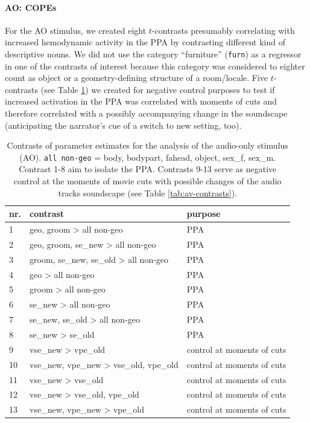 \documentclass[english]{article}
\begin{document}
\paragraph{AO: COPEs}



For the AO stimulus, we created eight $t$-contrasts presumably correlating with
increased hemodynamic activity in the PPA by contrasting different kind of
descriptive nouns.
We did not use the category ``furniture'' (\texttt{furn}) as a regressor in one
of the contrasts of interest because this category was considered to eighter
count as object or a geometry-defining structure of a room/locale.
Five $t$-contrasts (see Table \ref{tab:ao-contrasts}) we created for negative
control purposes to test if increased activation in the PPA was correlated with
moments of cuts and therefore correlated with a possibly accompanying change in
the soundscape (anticipating the narrator's cue of a switch to new setting, too).


\begin{table}[t]
    \caption{Contrasts of parameter estimates for the analysis of
        the audio-only stimulus (AO).
\texttt{all non-geo} = body, bodypart, fahead, object, sex\_f, sex\_m.
Contrast 1-8 aim to isolate the PPA.
Contrasts 9-13 serve as negative control at the moments of movie cuts
with possible changes of the audio tracks soundscape (see Table
\ref{tab:av-contrasts}).}

\label{tab:ao-contrasts}
\footnotesize
\begin{tabular}{lll}
\toprule
\textbf{nr.} &  \textbf{contrast} & \textbf{purpose} \\
\midrule
1 & geo, groom > all non-geo & PPA \tabularnewline
2 & geo, groom, se\_new > all non-geo & PPA \tabularnewline
3 & groom, se\_new, se\_old > all non-geo & PPA \tabularnewline
4 & geo > all non-geo & PPA \tabularnewline
5 & groom > all non-geo & PPA \tabularnewline
6 & se\_new > all non-geo & PPA \tabularnewline
7 & se\_new, se\_old > all non-geo & PPA \tabularnewline
8 & se\_new > se\_old & PPA \tabularnewline
9 & vse\_new > vpe\_old & control at moments of cuts \tabularnewline
10 & vse\_new, vpe\_new > vse\_old, vpe\_old & control at moments of cuts \tabularnewline
11 & vse\_new > vse\_old & control at moments of cuts \tabularnewline
12 & vse\_new > vse\_old, vpe\_old & control at moments of cuts \tabularnewline
13 & vse\_new, vpe\_new > vpe\_old & control at moments of cuts \tabularnewline
\end{tabular}
\end{table}
\end{document}
